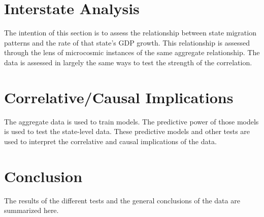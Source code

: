 \documentclass{article}
\begin{document}
\section{Interstate Analysis}
The intention of this section is to assess the relationship between state migration patterns and the rate of that state's GDP growth. This relationship is assessed through the lens of microcosmic instances of the same aggregate relationship. The data is assessed in largely the same ways to test the strength of the correlation.

\section{Correlative/Causal Implications}
The aggregate data is used to train models. The predictive power of those models is used to test the state-level data. These predictive models and other tests are used to interpret the correlative and causal implications of the data.

\section{Conclusion}
The results of the different tests and the general conclusions of the data are summarized here. 



\end{document}
